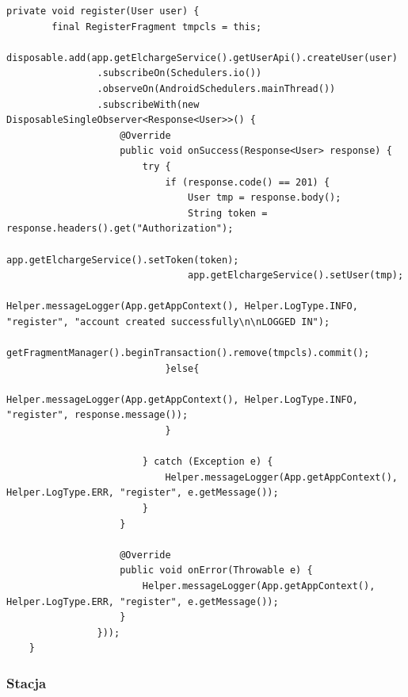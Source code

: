\begin{lstlisting}[label=list:android_register_async,caption=Rejestracja: wysłanie zapytania i obsługa odpowiedzi,basicstyle=\tiny\ttfamily]
    private void register(User user) {
        final RegisterFragment tmpcls = this;
        disposable.add(app.getElchargeService().getUserApi().createUser(user)
                .subscribeOn(Schedulers.io())
                .observeOn(AndroidSchedulers.mainThread())
                .subscribeWith(new DisposableSingleObserver<Response<User>>() {
                    @Override
                    public void onSuccess(Response<User> response) {
                        try {
                            if (response.code() == 201) {
                                User tmp = response.body();
                                String token = response.headers().get("Authorization");
                                app.getElchargeService().setToken(token);
                                app.getElchargeService().setUser(tmp);
                                Helper.messageLogger(App.getAppContext(), Helper.LogType.INFO, "register", "account created successfully\n\nLOGGED IN");
                                getFragmentManager().beginTransaction().remove(tmpcls).commit();
                            }else{
                                Helper.messageLogger(App.getAppContext(), Helper.LogType.INFO, "register", response.message());
                            }

                        } catch (Exception e) {
                            Helper.messageLogger(App.getAppContext(), Helper.LogType.ERR, "register", e.getMessage());
                        }
                    }

                    @Override
                    public void onError(Throwable e) {
                        Helper.messageLogger(App.getAppContext(), Helper.LogType.ERR, "register", e.getMessage());
                    }
                }));
    }
\end{lstlisting}

\subsubsection{Stacja}
